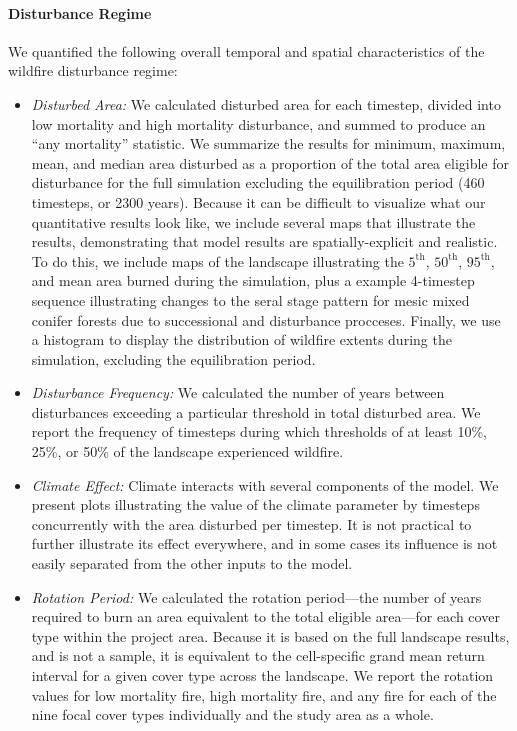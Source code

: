 \paragraph{Disturbance Regime} We quantified the following overall temporal and spatial characteristics of the wildfire disturbance regime:
\begin{itemize}
	\item \emph{Disturbed Area:} We calculated disturbed area for each timestep, divided into low mortality and high mortality disturbance, and summed to produce an ``any mortality'' statistic. We summarize the results for minimum, maximum, mean, and median area disturbed as a proportion of the total area eligible for disturbance for the full simulation excluding the equilibration period (460 timesteps, or 2300 years). Because it can be difficult to visualize what our quantitative results look like, we include several maps that illustrate the results, demonstrating that model results are spatially-explicit and realistic. To do this, we include maps of the landscape illustrating the $5^{\text{th}}$, $50^{\text{th}}$, $95^{\text{th}}$, and mean area burned during the simulation, plus a example 4-timestep sequence illustrating changes to the seral stage pattern for mesic mixed conifer forests due to successional and disturbance procceses. Finally, we use a histogram to display the distribution of wildfire extents during the simulation, excluding the equilibration period.
	\item \emph{Disturbance Frequency:} We calculated the number of years between disturbances exceeding a particular threshold in total disturbed area. We report the frequency of timesteps during which thresholds of at least 10\%, 25\%, or 50\% of the landscape experienced wildfire.
	\item \emph{Climate Effect:} Climate interacts with several components of the model. We present plots illustrating the value of the climate parameter by timesteps concurrently with the area disturbed per timestep. It is not practical to further illustrate its effect everywhere, and in some cases its influence is not easily separated from the other inputs to the model. 
	\item \emph{Rotation Period:} We calculated the rotation period---the number of years required to burn an area equivalent to the total eligible area---for each cover type within the project area. Because it is based on the full landscape results, and is not a sample, it is equivalent to the cell-specific grand mean return interval for a given cover type across the landscape. We report the rotation values for low mortality fire, high mortality fire, and any fire for each of the nine focal cover types individually and the study area as a whole.

\end{itemize}

